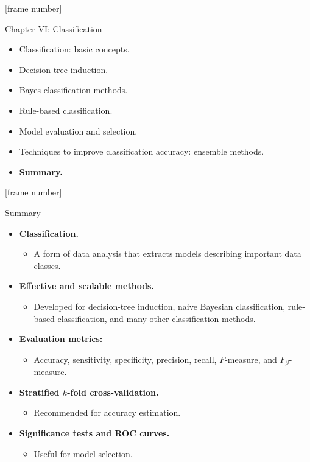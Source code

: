 \documentclass[aspectratio=169,t,table]{beamer}
\begin{document}
  {
    [frame number]
    \begin{frame}{Chapter VI: Classification}
        \begin{itemize}
            \item Classification: basic concepts.
            \item Decision-tree induction.
            \item Bayes classification methods.
            \item Rule-based classification.
            \item Model evaluation and selection.
            \item Techniques to improve classification accuracy: ensemble methods.
            \item \textbf{Summary.}
        \end{itemize}
    \end{frame}
  }

  {
    [frame number]
    \begin{frame}{Summary}
        \begin{itemize}
          \item \textbf{Classification.}
          \begin{itemize}
            \item A form of data analysis that extracts models describing important data classes.
          \end{itemize}
          \item \textbf{Effective and scalable methods.}
          \begin{itemize}
            \item Developed for decision-tree induction, naive Bayesian classification, rule-based classification, and many other classification methods.
          \end{itemize}
          \item \textbf{Evaluation metrics:}
          \begin{itemize}
            \item Accuracy, sensitivity, specificity, precision, recall, $F$-measure, and $F_\beta$-measure.
          \end{itemize}
          \item \textbf{Stratified $k$-fold cross-validation.}
          \begin{itemize}
            \item Recommended for accuracy estimation.
          \end{itemize}
          \item \textbf{Significance tests and ROC curves.}
          \begin{itemize}
            \item Useful for model selection.
          \end{itemize}
        \end{itemize}
    \end{frame}
  }
\end{document}
